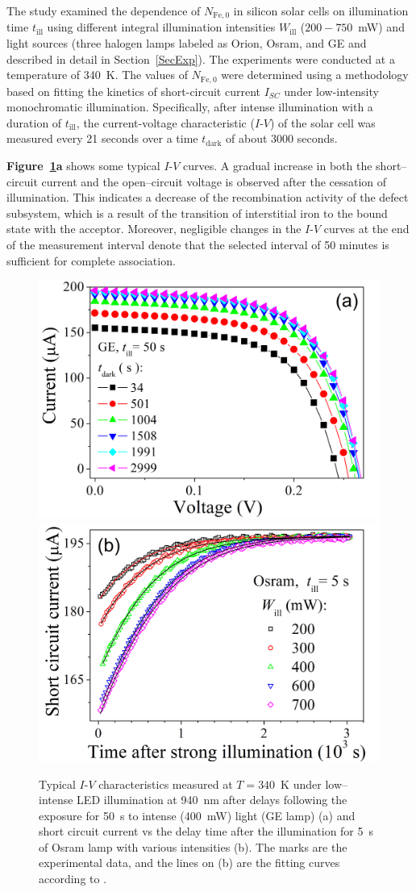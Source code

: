 \documentclass{WileyMSP-template}
\begin{document}
The study examined the dependence of $N_\mathrm{Fe,0}$ in silicon solar cells on illumination time $t_\mathrm{ill}$
using different integral illumination intensities $W_\mathrm{ill}$ ($200-750$~mW) and light sources
(three halogen lamps labeled as Orion, Osram, and GE and described in detail in Section~\ref{SecExp}).
The experiments were conducted at a temperature of 340~K.
The values of $N_\mathrm{Fe,0}$ were  determined using a methodology \cite{Olikh2022:JMatSci,Olikh2021JAP}
based on fitting the kinetics of short-circuit current $I_{SC}$ under low-intensity monochromatic illumination.
Specifically, after intense illumination with a duration of $t_\mathrm{ill}$,
the current-voltage characteristic ($I$-$V$) of the solar cell was measured every 21 seconds over a time $t_\mathrm{dark}$ of about 3000 seconds.

\textbf{Figure~\ref{fig2}a} shows some typical $I$-$V$ curves.
A gradual increase in both the short--circuit current and the open--circuit voltage is observed after the cessation of illumination.
This indicates a decrease of the recombination activity of the defect subsystem,
which is a result of the transition of interstitial iron to the bound state with the acceptor.
Moreover, negligible changes in the $I$-$V$ curves at the end of the measurement interval denote that the selected interval of 50 minutes is sufficient for complete association.


\begin{figure}
\centering
  \includegraphics[width=0.4\linewidth]{Fig2a.png}
  \includegraphics[width=0.4\linewidth]{Fig2b.png}
  \caption{Typical $I$-$V$ characteristics measured at $T=340$~K
  under low--intense LED illumination at 940~nm after delays following the exposure for 50~s to intense (400~mW) light (GE lamp) (a) and
  short circuit current vs the delay time after the illumination for 5~s of Osram lamp with various intensities (b).
  The marks are the experimental data, and the lines on (b) are the fitting curves according to \cite{Olikh2022:JMatSci,Olikh2021JAP}.
  }
  \label{fig2}
\end{figure}
\end{document}
